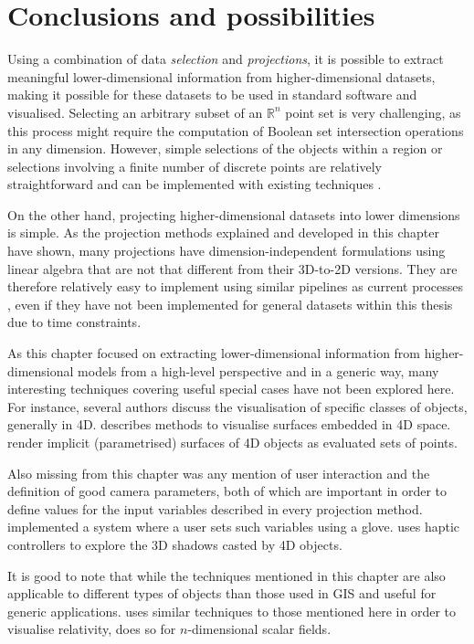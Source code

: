 \section{Conclusions and possibilities}
\label{se:slicing-conclusions}

Using a combination of data \emph{selection} and \emph{projections}, it is possible to extract meaningful lower-dimensional information from higher-dimensional datasets, making it possible for these datasets to be used in standard software and visualised.
Selecting an arbitrary subset of an $\mathbb{R}^n$ point set is very challenging, as this process might require the computation of Boolean set intersection operations in any dimension.
However, simple selections of the objects within a region or selections involving a finite number of discrete points are relatively straightforward and can be implemented with existing techniques \citep{Hanson94}.

On the other hand, projecting higher-dimensional datasets into lower dimensions is simple.
As the projection methods explained and developed in this chapter have shown, many projections have dimension-independent formulations using linear algebra that are not that different from their 3D-to-2D versions.
They are therefore relatively easy to implement using similar pipelines as current processes \citep{Chu09}, even if they have not been implemented for general datasets within this thesis due to time constraints.

As this chapter focused on extracting lower-dimensional information from higher-dimensional models from a high-level perspective and in a generic way, many interesting techniques covering useful special cases have not been explored here.
For instance, several authors discuss the visualisation of specific classes of objects, generally in 4D.
\citet{Hoffmann90} describes methods to visualise surfaces embedded in 4D space.
\citet{Balsys07} render implicit (parametrised) surfaces of 4D objects as evaluated sets of points.

Also missing from this chapter was any mention of user interaction and the definition of good camera parameters, both of which are important in order to define values for the input variables described in every projection method.
\citet{Feiner90} implemented a system where a user sets such variables using a glove.
\citet{Zhang07} uses haptic controllers to explore the 3D shadows casted by 4D objects.

It is good to note that while the techniques mentioned in this chapter are also applicable to different types of objects than those used in GIS and useful for generic applications.
\citet{Hanson01} uses similar techniques to those mentioned here in order to visualise relativity, \citet{Bajaj98} does so for $n$-dimensional scalar fields.